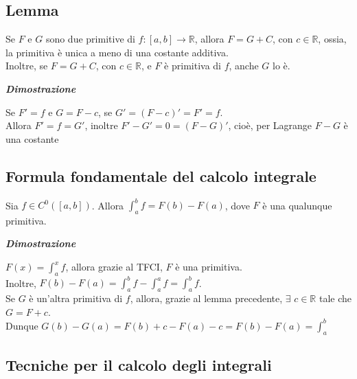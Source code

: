 \documentclass{article}
\theoremstyle{definition}
\newcommand{\R}{\mathbb{R}}
\begin{document}
\subsection{Lemma}
Se $F$ e $G$ sono due primitive di $f:[a,b] \to \R$, allora $F=G+C$, con $c \in \R$, ossia, la primitiva è unica a meno di una costante additiva.
\\
Inoltre, se $F=G+C$, con $c \in \R$, e $F$ è primitiva di $f$, anche $G$ lo è.
\\
\begin{center}
    \textbf{\textit{Dimostrazione}}
\end{center}
Se $F'=f$ e $G=F-c$, se $G'=(F-c)'=F'=f$.
\\
Allora $F'=f=G'$, inoltre $F'-G'=0=(F-G)'$, cioè, per Lagrange $F-G$ è una costante
\subsection{Formula fondamentale del calcolo integrale}
Sia $f \in C^0([a,b])$. Allora $\int_a^b f=F(b)-F(a)$, dove $F$ è una qualunque primitiva.
\begin{center}
    \textbf{\textit{Dimostrazione}}
\end{center}
$F(x)=\int_a^x f$, allora grazie al TFCI, $F$ è una primitiva.
\\
Inoltre, $F(b)-F(a)=\int_a^bf-\int_a^a f=\int_a^b f$.
\\
Se $G$ è un'altra primitiva di $f$, allora, grazie al lemma precedente, $\exists \,\, c \in \R$ tale che $G=F+c$.
\\
Dunque $G(b)-G(a)=F(b)+c-F(a)-c=F(b)-F(a)=\int_a^b$


\subsection{Tecniche per il calcolo degli integrali}
\end{document}
